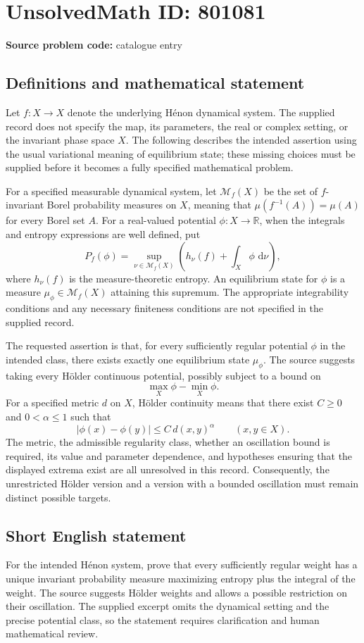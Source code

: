 \documentclass[11pt]{article}
\newcommand{\R}{\mathbb{R}}
\newcommand{\dd}{\,\mathrm{d}}
\begin{document}
\section*{UnsolvedMath ID: 801081}
\textbf{Source problem code:} catalogue entry
\subsection{Definitions and mathematical statement}
Let \(f\colon X\to X\) denote the underlying H\'enon dynamical system. The supplied record does not specify the map, its parameters, the real or complex setting, or the invariant phase space \(X\). The following describes the intended assertion using the usual variational meaning of equilibrium state; these missing choices must be supplied before it becomes a fully specified mathematical problem.

For a specified measurable dynamical system, let \(\mathcal M_f(X)\) be the set of \(f\)-invariant Borel probability measures on \(X\), meaning that \(\mu(f^{-1}(A))=\mu(A)\) for every Borel set \(A\). For a real-valued potential \(\phi\colon X\to\R\), when the integrals and entropy expressions are well defined, put
\[
P_f(\phi)=\sup_{\nu\in\mathcal M_f(X)}\left(h_\nu(f)+\int_X\phi\,\dd\nu\right),
\]
where \(h_\nu(f)\) is the measure-theoretic entropy. An equilibrium state for \(\phi\) is a measure \(\mu_\phi\in\mathcal M_f(X)\) attaining this supremum. The appropriate integrability conditions and any necessary finiteness conditions are not specified in the supplied record.

The requested assertion is that, for every sufficiently regular potential \(\phi\) in the intended class, there exists exactly one equilibrium state \(\mu_\phi\). The source suggests taking every H\"older continuous potential, possibly subject to a bound on
\[
\max_X\phi-\min_X\phi.
\]
For a specified metric \(d\) on \(X\), H\"older continuity means that there exist \(C\geq0\) and \(0<\alpha\leq1\) such that
\[
|\phi(x)-\phi(y)|\leq C\,d(x,y)^\alpha\qquad(x,y\in X).
\]
The metric, the admissible regularity class, whether an oscillation bound is required, its value and parameter dependence, and hypotheses ensuring that the displayed extrema exist are all unresolved in this record. Consequently, the unrestricted H\"older version and a version with a bounded oscillation must remain distinct possible targets.
\subsection{Short English statement}
For the intended H\'enon system, prove that every sufficiently regular weight has a unique invariant probability measure maximizing entropy plus the integral of the weight. The source suggests H\"older weights and allows a possible restriction on their oscillation. The supplied excerpt omits the dynamical setting and the precise potential class, so the statement requires clarification and human mathematical review.
\end{document}
